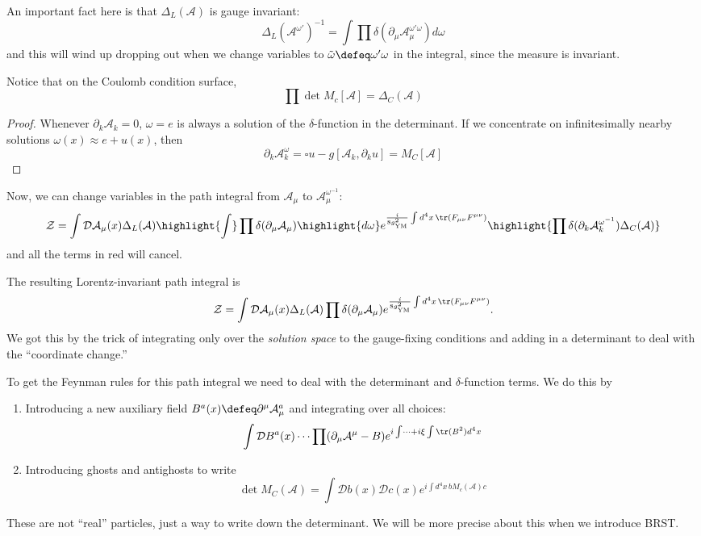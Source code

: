 An important fact here is that $\Delta_L(\mathcal A)$ is gauge invariant:
\[
\Delta_L(\mathcal A^{\omega'})^{-1} = \int \prod \delta(\partial_\mu \mathcal A_\mu^{\omega' \omega}) d \omega
\]
and this will wind up dropping out when we change variables to $\tilde \omega \defeq \omega' \omega$ in the integral, since the measure is invariant.

Notice that on the Coulomb condition surface,
\[
\prod \det M_c[\mathcal A] = \Delta_C(\mathcal A)
\]
\begin{proof}
Whenever $\partial _k \mathcal A_k = 0$, $\omega = e$ is always a solution of the $\delta$-function in the determinant.
If we concentrate on infinitesimally nearby solutions $\omega(x) \approx e + u(x)$, then
\[
\partial_k \mathcal A_k^\omega = \square u - g [\mathcal A_k, \partial_k u] = M_C[\mathcal A]
\]
\end{proof}

Now, we can change variables in the path integral from $\mathcal A_\mu$ to $\mathcal A_\mu^{\omega^{-1}}$:
\[
\mathcal Z = \int \mathcal D \mathcal A_\mu(x) \Delta_L(\mathcal A) \highlight{\int} \prod \delta(\partial_\mu \mathcal A_\mu) \highlight{d \omega} e^{\frac{i}{8 g_{\text{YM}}^2} \int d^4x\, \tr(F_{\mu \nu}F^{\mu \nu})} \highlight{\prod \delta(\partial_k \mathcal A_k^{\omega^{-1}}) \Delta_C(\mathcal A)}
\]
and all the terms in red will cancel.

The resulting Lorentz-invariant path integral is
\[
\mathcal Z = \int \mathcal D \mathcal A_\mu(x) \Delta_L(\mathcal A) \prod \delta(\partial_\mu \mathcal A_\mu)  e^{\frac{i}{8 g_{\text{YM}}^2} \int d^4x\, \tr(F_{\mu \nu}F^{\mu \nu})}.
\]
We got this by the trick of integrating only over the \emph{solution space} to the gauge-fixing conditions and adding in a determinant to deal with the ``coordinate change.''

To get the Feynman rules for this path integral we need to deal with the determinant and $\delta$-function terms.
We do this by
\begin{enumerate}
    \item Introducing a new auxiliary field $B^a(x) \defeq \partial^\mu \mathcal A_\mu^a$ and integrating over all choices:
    \[
    \int \mathcal D B^a(x) \cdots \prod (\partial_\mu \mathcal A^\mu - B) e^{i \int \cdots + i \xi \int \tr(B^2) d^4x}
    \]
    \item Introducing ghosts and antighosts to write
    \[
    \det M_C(\mathcal A) = \int \mathcal D b(x) \mathcal D c(x) e^{i \int d^4x\, bM_c(\mathcal A) c}
    \]
\end{enumerate}
These are not ``real'' particles, just a way to write down the determinant.
We will be more precise about this when we introduce BRST.

